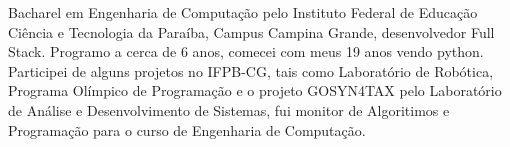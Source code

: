 \begin{cvletter}
  Bacharel em Engenharia de Computação pelo Instituto Federal de Educação Ciência e
  Tecnologia da Paraíba, Campus Campina Grande, desenvolvedor Full Stack. Programo a 
  cerca de 6 anos, comecei com meus 19 anos vendo python. Participei de alguns projetos 
  no IFPB-CG, tais como Laboratório de Robótica, Programa Olímpico de Programação e o 
  projeto GOSYN4TAX pelo Laboratório de Análise e Desenvolvimento de Sistemas, fui monitor de
  Algoritimos e Programação para o curso de Engenharia de Computação.

\end{cvletter}